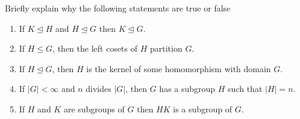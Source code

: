 \documentclass[12 pt, letterpaper]{hmcpset}
\begin{document}
\pagebreak

\begin{problem}[5.]
	Briefly explain why the following statements are true or false
	\begin{enumerate}
		\item If $K \trianglelefteq H$ and $H \trianglelefteq G$ then $K \trianglelefteq G$.
		\item If $H \le G$, then the left cosets of $H$ partition $G$.
		\item If $H \trianglelefteq G$, then $H$ is the kernel of some homomorphism with domain $G$.
		\item If $\lvert G \rvert < \infty$ and $n$ divides $\lvert G \rvert$, then $G$ has a subgroup $H$ such that $\lvert H \rvert = n$.
		\item If $H$ and $K$ are subgroups of $G$ then $HK$ is a subgroup of $G$.
	\end{enumerate}
\end{problem}
\end{document}
